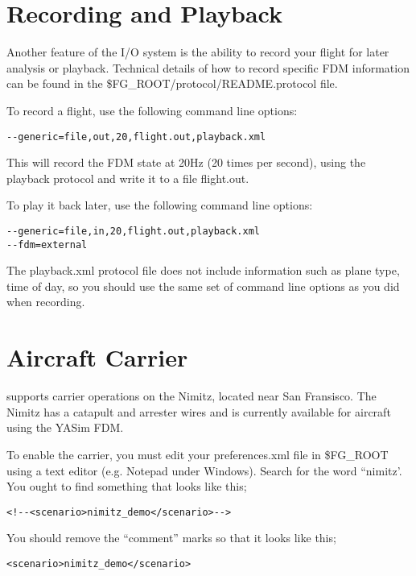 \section{Recording and Playback}

Another feature of the I/O system is the ability to record your flight for
later analysis or playback. Technical details of how to record specific FDM
information can be found in the \$FG\_ROOT/protocol/README.protocol file.

To record a flight, use the following command line options:

\begin{verbatim}
--generic=file,out,20,flight.out,playback.xml
\end{verbatim}

This will record the FDM state at 20Hz (20 times per second), using the playback
protocol and write it to a file flight.out.

To play it back later, use the following command line options:

\begin{verbatim}
--generic=file,in,20,flight.out,playback.xml
--fdm=external
\end{verbatim}

The playback.xml protocol file does not include information such as plane type,
time of day, so you should use the same set of command line options as you
did when recording.

\section{Aircraft Carrier}

\FlightGear{} supports carrier operations on the Nimitz, located near San Fransisco. The Nimitz has a catapult
and arrester wires and is currently available for aircraft using the YASim FDM. 

To enable the carrier, you must edit your preferences.xml file in \$FG\_ROOT using a text editor (e.g. Notepad
under Windows). Search for the word ``nimitz'. You ought to find something that looks like this;

\begin{verbatim}
<!--<scenario>nimitz_demo</scenario>--> 
\end{verbatim}

You should remove the ``comment'' marks so that it looks like this;


\begin{verbatim}
<scenario>nimitz_demo</scenario> 
\end{verbatim}

